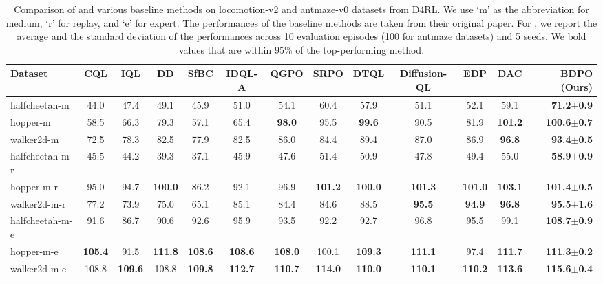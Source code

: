 
\begin{table}[h!]
\centering
\setlength{\tabcolsep}{1.1mm}{}
\caption{Comparison of \algbb and various baseline methods on locomotion-v2 and antmaze-v0 datasets from D4RL. We use `m' as the abbreviation for medium, `r' for replay, and `e' for expert. The performances of the baseline methods are taken from their original paper. For \algbb, we report the average and the standard deviation of the performances across 10 evaluation episodes (100 for antmaze datasets) and 5 seeds. We bold values that are within $95\%$ of the top-performing method.}
\label{tab:d4rl}
\small{
\begin{tabular}{lccccccccccc|r}
\toprule
\textbf{Dataset} & \textbf{CQL} & \textbf{IQL} & \textbf{DD} & \textbf{SfBC} & \textbf{IDQL-A} & \textbf{QGPO} & \textbf{SRPO} & \textbf{DTQL} & \textbf{Diffusion-QL} & \textbf{EDP} & \textbf{DAC} & \textbf{BDPO (Ours)}\\ 
\midrule
halfcheetah-m & 44.0 & 47.4 & 49.1 & 45.9 & 51.0 &  54.1 & 60.4 & 57.9 & 51.1 
& 52.1 & 59.1 & \textbf{71.2$\pm$0.9}\\ 
hopper-m & 58.5 & 66.3 & 79.3 & 57.1 & 65.4 & \textbf{98.0} & 95.5 & \textbf{99.6} & 90.5 & 81.9 & \textbf{101.2} & \textbf{100.6$\pm$0.7}\\ 
walker2d-m & 72.5 & 78.3 & 82.5 & 77.9 & 82.5 & 86.0 & 84.4 & 89.4 & 87.0 & 86.9 & \textbf{96.8} & \textbf{93.4$\pm$0.5}\\ 
halfcheetah-m-r & 45.5 & 44.2 & 39.3 & 37.1 & 45.9 & 47.6 & 51.4 & 50.9 & 47.8 & 49.4 &55.0 & \textbf{58.9$\pm$0.9}\\ 
hopper-m-r & 95.0 & 94.7 & \textbf{100.0} & 86.2 & 92.1 & 96.9 & \textbf{101.2} & \textbf{100.0} & 
\textbf{101.3} & \textbf{101.0} & \textbf{103.1} & \textbf{101.4$\pm$0.5}\\ 
walker2d-m-r & 77.2 & 73.9 & 75.0 & 65.1 & 85.1 & 84.4 & 84.6 & 88.5 & \textbf{95.5} & \textbf{94.9} & \textbf{96.8} & \textbf{95.5$\pm$1.6}\\ 
halfcheetah-m-e & 91.6 & 86.7 & 90.6 & 92.6 & 95.9 & 93.5 & 92.2 & 92.7 & 96.8& 95.5 &99.1  & \textbf{108.7$\pm$0.9}\\ 
hopper-m-e & \textbf{105.4} & 91.5 & \textbf{111.8} & \textbf{108.6} & \textbf{108.6} & \textbf{108.0} & 
100.1 &\textbf{109.3} & \textbf{111.1} & 
97.4 & \textbf{111.7} & \textbf{111.3$\pm$0.2}\\ 
walker2d-m-e & 108.8 & \textbf{109.6} & 108.8 & \textbf{109.8} & \textbf{112.7} & \textbf{110.7} & \textbf{114.0} & \textbf{110.0} & \textbf{110.1} & \textbf{110.2} & \textbf{113.6} & \textbf{115.6$\pm$0.4}\\ 

\end{tabular}}
\end{table}

